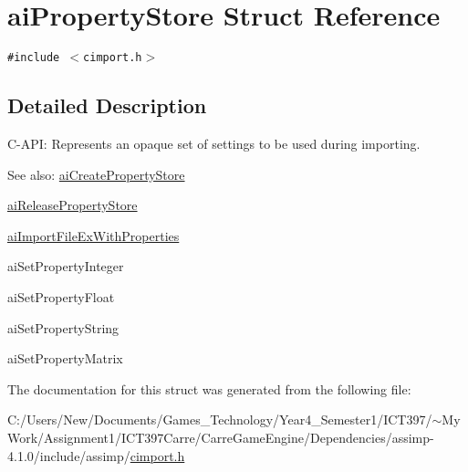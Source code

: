\hypertarget{structai_property_store}{
\section{aiPropertyStore Struct Reference}
\label{structai_property_store}
}
{\tt \#include $<$cimport.h$>$}



\subsection{Detailed Description}
C-API: Represents an opaque set of settings to be used during importing. \begin{Desc}
\item[See also:]\hyperlink{cimport_8h_523d3d8b510203fb1a80d8702283f8c9}{aiCreatePropertyStore} 

\hyperlink{cimport_8h_579dddd75dbba5621c235df780ffc3e6}{aiReleasePropertyStore} 

\hyperlink{cimport_8h_9ec6845e46be4043cedb579bb85fcc0c}{aiImportFileExWithProperties} 

aiSetPropertyInteger 

aiSetPropertyFloat 

aiSetPropertyString 

aiSetPropertyMatrix \end{Desc}


The documentation for this struct was generated from the following file:\begin{CompactItemize}
\item 
C:/Users/New/Documents/Games\_\-Technology/Year4\_\-Semester1/ICT397/$\sim$My Work/Assignment1/ICT397Carre/CarreGameEngine/Dependencies/assimp-4.1.0/include/assimp/\hyperlink{cimport_8h}{cimport.h}\end{CompactItemize}
